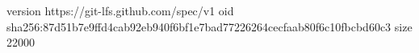 version https://git-lfs.github.com/spec/v1
oid sha256:87d51b7e9ffd4cab92eb940f6bf1e7bad77226264cecfaab80f6c10fbcbd60c3
size 22000
